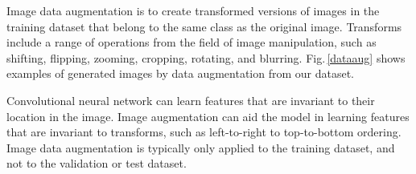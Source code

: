Image data augmentation is to create transformed versions of images in the training dataset that belong to the same class as the original image. Transforms include a range of operations from the field of image manipulation, such as shifting, flipping, zooming, cropping, rotating, and blurring. Fig.\,\ref{dataaug} shows examples of generated images by data augmentation from our dataset.

Convolutional neural network can learn features that are invariant to their location in the image. Image augmentation can aid the model in learning features that are invariant to transforms, such as left-to-right to top-to-bottom ordering. Image data augmentation is typically only applied to the training dataset, and not to the validation or test dataset. 



